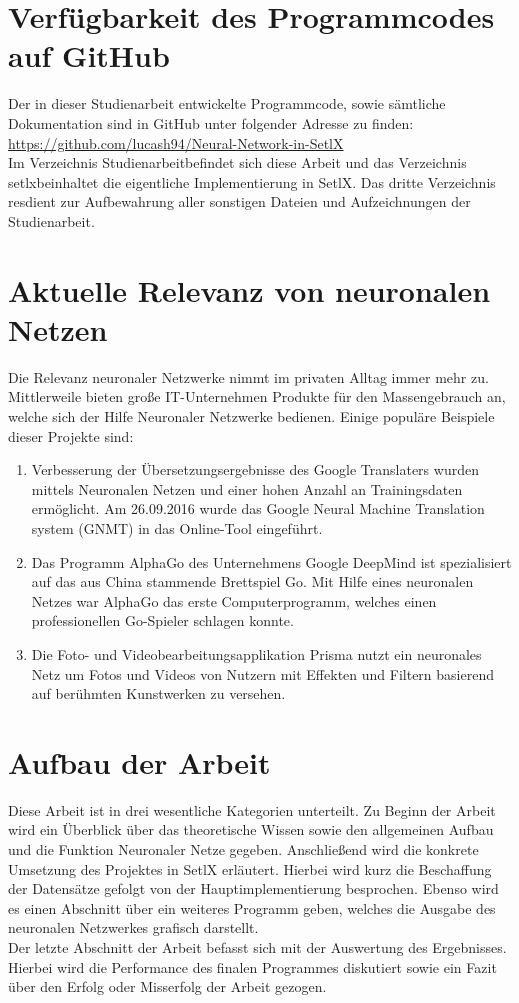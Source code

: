 \section{Verfügbarkeit des Programmcodes auf GitHub}
Der in dieser Studienarbeit entwickelte Programmcode, sowie sämtliche Dokumentation sind in GitHub unter folgender Adresse zu finden:
\\[0.2cm]
\hspace*{1.3cm}
\href{https://github.com/lucash94/Neural-Network-in-SetlX/}{https://github.com/lucash94/Neural-Network-in-SetlX}
\\[0.2cm]
Im Verzeichnis \glqq Studienarbeit\grqq befindet sich diese Arbeit und das Verzeichnis \glqq setlx\grqq beinhaltet die eigentliche Implementierung in SetlX. Das dritte Verzeichnis \glqq res\grqq dient zur Aufbewahrung aller sonstigen Dateien und Aufzeichnungen der Studienarbeit.

\section{Aktuelle Relevanz von neuronalen Netzen}
Die Relevanz neuronaler Netzwerke nimmt im privaten Alltag immer mehr zu. Mittlerweile bieten große IT-Unternehmen Produkte für den Massengebrauch an, welche sich der Hilfe Neuronaler Netzwerke bedienen. Einige populäre Beispiele dieser Projekte sind:
\begin{enumerate}
\item Verbesserung der Übersetzungsergebnisse des Google Translaters wurden mittels Neuronalen Netzen und einer hohen Anzahl an Trainingsdaten ermöglicht. Am 26.09.2016 wurde das Google Neural Machine Translation system (GNMT) in das Online-Tool eingeführt. \cite{gnmt:2017}
\item Das Programm AlphaGo des Unternehmens Google DeepMind ist spezialisiert auf das aus China stammende Brettspiel Go. Mit Hilfe eines neuronalen Netzes war AlphaGo das erste Computerprogramm, welches einen professionellen Go-Spieler schlagen konnte. \cite{alphago:2017}
\item Die Foto- und Videobearbeitungsapplikation Prisma nutzt ein neuronales Netz um Fotos und Videos von Nutzern mit Effekten und Filtern basierend auf berühmten Kunstwerken zu versehen. \cite{prismaai:2017}
\end{enumerate}

\section{Aufbau der Arbeit}
Diese Arbeit ist in drei wesentliche Kategorien unterteilt. Zu Beginn der Arbeit wird ein Überblick über das theoretische Wissen sowie den allgemeinen Aufbau und die Funktion Neuronaler Netze gegeben. Anschließend wird die konkrete Umsetzung des Projektes in SetlX erläutert. Hierbei wird kurz die Beschaffung der Datensätze gefolgt von der Hauptimplementierung besprochen. Ebenso wird es einen Abschnitt über ein weiteres Programm geben, welches die Ausgabe des neuronalen Netzwerkes grafisch darstellt. \\
Der letzte Abschnitt der Arbeit befasst sich mit der Auswertung des Ergebnisses. Hierbei wird die Performance des finalen Programmes diskutiert sowie ein Fazit über den Erfolg oder Misserfolg der Arbeit gezogen.